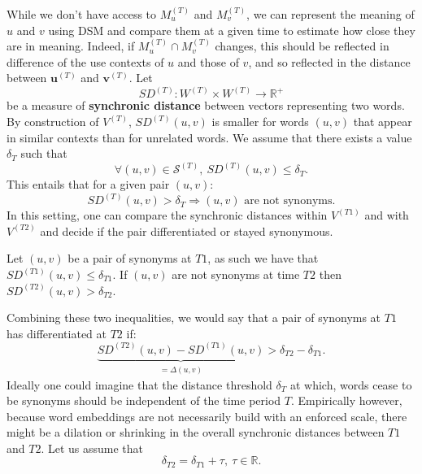 \documentclass[11pt]{article}
\newcommand{\vocab}{W}
\newcommand{\vectorspaceT}{V^{(T)}}
\newcommand{\vectorspaceOne}{V^{(T1)}}
\newcommand{\vectorspaceTwo}{V^{(T2)}}
\newcommand{\reprVector}[2]{\mathbf{#1}^{(#2)}}
\newcommand{\reprVectorT}[1]{\reprVector{#1}{T}}
\newcommand{\synonymsSet}{\mathcal{S}}
\newcommand{\synOne}{u}%
\newcommand{\synTwo}{v}%
\newcommand{\synpair}{(\synOne,\synTwo)}
\newcommand{\firstTime}{T1}
\newcommand{\secondTime}{T2}
\begin{document}
While we don't have access to $M_{u}^{(T)}$ and $M_{v}^{(T)}$, we can represent the meaning of $u$ and $v$ using DSM and compare them at a given time to estimate how close they are in meaning. Indeed, if $M_{u}^{(T)} \cap M_{v}^{(T)}$ changes, this should be reflected in difference of the use contexts of $u$ and those of $v$, and so reflected in the distance between $\reprVectorT{\synOne}$ and $\reprVectorT{\synTwo}$. 
Let 
\begin{equation*}
    SD^{(T)}: \vocab^{(T)} \times \vocab^{(T)} \rightarrow \mathbb{R}^+
\end{equation*}
 be a measure of \textbf{synchronic distance} between vectors representing two words. By construction of $\vectorspaceT$, $SD^{(T)}\synpair$ is smaller for words $\synpair$ that appear in similar contexts than for unrelated words. We assume that there exists a value $\delta_T$ such that 
 \begin{equation*}
 \forall (u,v)\in\synonymsSet^{(T)},\> SD^{(T)}(u,v) \le \delta_T.
 \end{equation*}
 This entails that for a given pair $(u,v)$: 
 \begin{equation*}
 SD^{(T)}(u,v) > \delta_T \Rightarrow (u, v) \textrm{ are not synonyms}.
 \end{equation*}
In this setting, one can compare the synchronic distances within $\vectorspaceOne$ and with $\vectorspaceTwo$ and decide if the pair differentiated or stayed synonymous.

Let $\synpair$ be a pair of synonyms at $\firstTime$, as such we have that $
SD^{(\firstTime)}(u,v)\le\delta_{\firstTime}$.
If $(u,v)$ are not synonyms at time $\secondTime$ then 
$SD^{(\secondTime)}(u,v)>\delta_{\secondTime}$.

Combining these two inequalities, we would say that a pair of synonyms at $\firstTime$ has differentiated at $\secondTime$ if: 
\begin{equation*}
\underbrace{SD^{(\secondTime)}\synpair-SD^{(\firstTime)}\synpair}_{\textstyle\begin{gathered} =\Delta\synpair \end{gathered} } >\delta_{\secondTime}-\delta_{\firstTime}.
\end{equation*}
Ideally one could imagine that the distance threshold $\delta_T$ at which, words cease to be synonyms should be independent of the time period $T$. Empirically however, because word embeddings are not necessarily build with an enforced scale, there might be a dilation or shrinking in the overall synchronic distances between $\firstTime$ and $\secondTime$. Let us assume that 
\begin{equation*}
\delta_{\secondTime}=\delta_{\firstTime}+\tau,\>\tau\in\mathbb{R}.
\end{equation*}  
\end{document}
